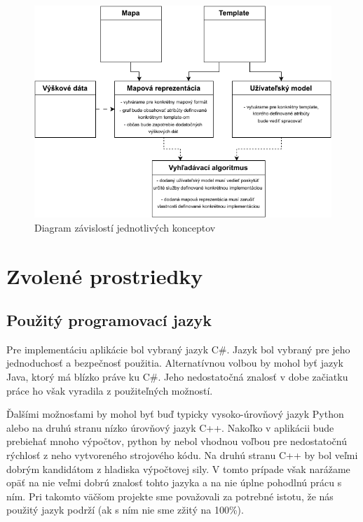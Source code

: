 \begin{figure}[h]\centering
\includegraphics[]{img/konceptove_zavislosti}
\caption{Diagram závislostí jednotlivých konceptov} 
\label{obr01:konceptove_zavislosti}
\end{figure}

\pagebreak

\section{Zvolené prostriedky}

\subsection{Použitý programovací jazyk}

Pre implementáciu aplikácie bol vybraný jazyk C\#. Jazyk bol vybraný pre jeho jednoduchosť a bezpečnosť použitia. Alternatívnou volbou by mohol byť jazyk Java, ktorý má blízko práve ku C\#. Jeho nedostatočná znalosť v dobe začiatku práce ho však vyradila z použiteľných možností. 

Ďalšími možnosťami by mohol byť buď typicky vysoko-úrovňový jazyk Python alebo na druhú stranu nízko úrovňový jazyk C++. Nakoľko v aplikácii bude prebiehať mnoho výpočtov, python by nebol vhodnou voľbou pre nedostatočnú rýchlosť z neho vytvoreného strojového kódu. Na druhú stranu C++ by bol veľmi dobrým kandidátom z hladiska výpočtovej sily. V tomto prípade však narážame opäť na nie veľmi dobrú znalosť tohto jazyka a na nie úplne pohodlnú prácu s ním. Pri takomto väčšom projekte sme považovali za potrebné istotu, že nás použitý jazyk podrží (ak s ním nie sme zžitý na 100\%). 

